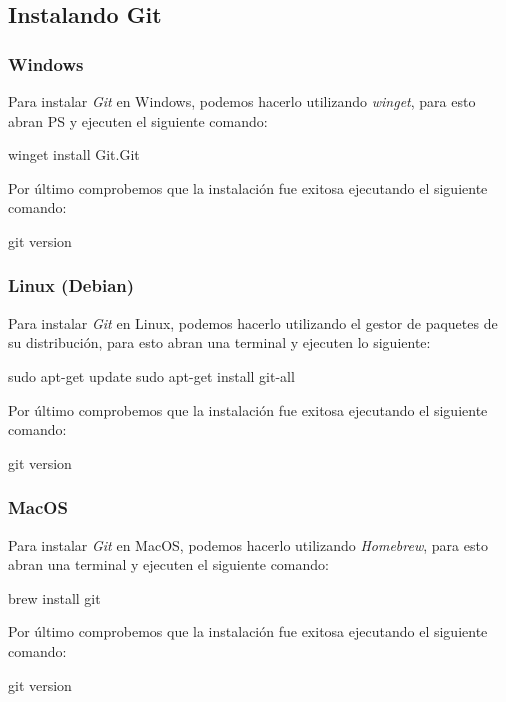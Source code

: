 \subsection{Instalando Git}
  \subsubsection{Windows}
    Para instalar \textit{Git} en Windows, podemos hacerlo utilizando \textit{winget}, para esto
    abran PS y ejecuten el siguiente comando:

    \begin{powershell}
      winget install Git.Git
    \end{powershell}

    Por último comprobemos que la instalación fue exitosa ejecutando el siguiente comando:

    \begin{powershell}
      git version
    \end{powershell}

  \subsubsection{Linux (Debian)}
    Para instalar \textit{Git} en Linux, podemos hacerlo utilizando el gestor de paquetes de su
    distribución, para esto abran una terminal y ejecuten lo siguiente:

    \begin{bash}
      sudo apt-get update
      sudo apt-get install git-all
    \end{bash}

    Por último comprobemos que la instalación fue exitosa ejecutando el siguiente comando:

    \begin{bash}
      git version
    \end{bash}

  \subsubsection{MacOS}
    Para instalar \textit{Git} en MacOS, podemos hacerlo utilizando \textit{Homebrew}, para esto
    abran una terminal y ejecuten el siguiente comando:

    \begin{bash}
      brew install git
    \end{bash}

    Por último comprobemos que la instalación fue exitosa ejecutando el siguiente comando:

    \begin{bash}
      git version
    \end{bash}
